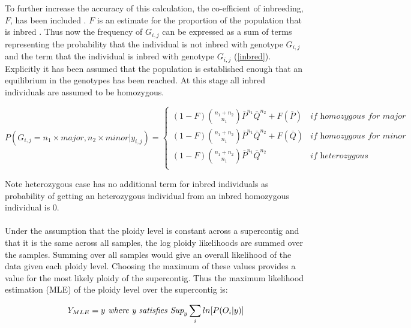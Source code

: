 \documentclass[11pt]{article}
\begin{document}
To further increase the accuracy of this calculation, the co-efficient of inbreeding, $F$, has been included \autocite{Vieira2013}. $F$ is an estimate for the proportion of the population that is inbred \autocite{Howard2017}. Thus now the frequency of $G_{i,j}$ can be expressed as a sum of terms representing the probability that the individual is not inbred with genotype $G_{i,j}$ and the term that the individual is inbred with genotype $G_{i,j}$ (\ref{inbred}). Explicitly it has been assumed that the population is established enough that an equilibrium in the genotypes has been reached. At this stage all inbred individuals are assumed to be homozygous.

\begin{equation}\label{inbred}
P(G_{i,j}=n_{1}\times\textit{major},n_{2}\times\textit{minor}|y_{i,j})=	\begin{cases} 
		(1-F)\binom{n_{1} + n_{2} }{n_{1} } \bar{P}^{n_1} \bar{Q}^{n_2} + F(\bar{P}) & \textit{if homozygous for major} \\
				(1-F)\binom{n_{1} + n_{2} }{n_{1} } \bar{P}^{n_1} \bar{Q}^{n_2} + F(\bar{Q}) & \textit{if homozygous for minor} \\
				(1-F)\binom{n_{1} + n_{2} }{n_{1} } \bar{P}^{n_1} \bar{Q}^{n_2}  & \textit{if heterozygous} \\
	\end{cases}
\end{equation} 

Note heterozygous case has no additional term for inbred individuals as probability of getting an heterozygous individual from an inbred homozygous individual is 0.
\paragraph{}Under the assumption that the ploidy level is constant across a supercontig and that it is the same across all samples, the log ploidy likelihoods are summed over the samples. Summing over all samples would give an overall likelihood of the data given each ploidy level. Choosing the maximum of these values provides a value for the most likely ploidy of the supercontig. Thus the maximum likelihood estimation (MLE) of the ploidy level over the supercontig is:

\begin{equation}
Y_{MLE}= y \\
\textit{ 	where y satisfies	 } \\
\textit{Sup}_{y}\sum_{i}ln[P(O_{i}|y)]
\end{equation}
\end{document}
